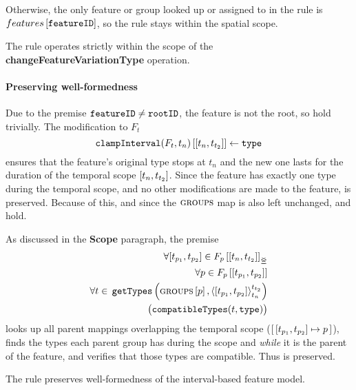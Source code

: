Otherwise, the only feature or group looked up or assigned to in the rule is $features \left[ \texttt{featureID} \right]$, so the rule stays within the spatial scope.
\\

\begin{lemma}
   The  rule operates strictly within the scope of the \textbf{changeFeatureVariationType} operation.
   \label{lemma:change-feature-variation-type-scope}
\end{lemma}

\paragraph{Preserving well-formedness}
Due to the premise $\texttt{featureID} \neq \texttt{rootID}$, the feature is not the root, so  hold trivially. The modification to $F_t$
\[
   \lookup{\var{clampInterval}(F_t, t_n)}{\interval{t_n}{t_{t_2}}} \assign \var{type}
\]
ensures that the feature's original type stops at $t_n$ and the new one lasts for the duration of the temporal scope $\interval{t_n}{t_{t_2}}$. Since the feature has exactly one type during the temporal scope, and no other modifications are made to the feature,  is preserved. Because of this, and since the $\textsc{groups}{}{}$ map is also left unchanged,  and  hold. 

As discussed in the \textbf{Scope} paragraph, the premise 
\[
   \begin{split}
      \forall \interval{t_{p_1}}{t_{p_2}} \in \overlapping{F_p}{t_n}{t_{t_2}}  \\ %
      \forall p \in \lookup{F_p}{\interval{t_{p_1}}{t_{p_2}}}  \\%
      \forall t \in \, \var{getTypes}\left(\lookup{\groups}{p}, \clamp{\interval{t_{p_1}}{t_{p_2}}}{t_n}{t_{t_2}}\right)  \\
          \big(\var{compatibleTypes}(t, \var{type})\big) 
    \end{split}
\]
looks up all parent mappings overlapping the temporal scope ($\intervalmapping{t_{p_1}}{t_{p_2}}{p}$), finds the types each parent group has during the scope and \emph{while} it is the parent of the feature, and verifies that those types are compatible. Thus  is preserved.
\\

\begin{lemma}
   The  rule preserves well-formedness of the interval-based feature model. 
   \label{lemma:change-feature-variation-type-well-formed}
\end{lemma}

